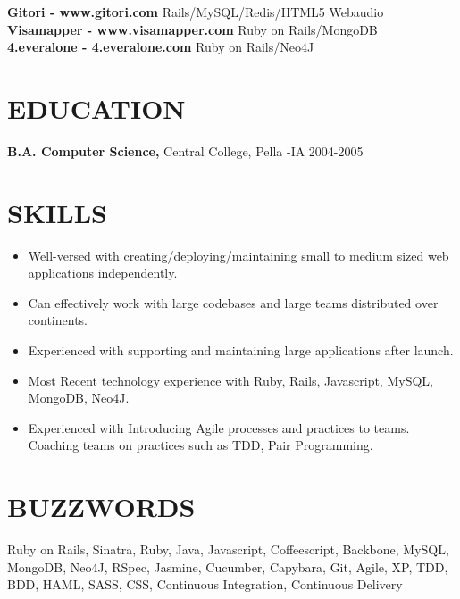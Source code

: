 \documentclass{res}
\begin{document}
\begin{resume}
\begin{tabbing}
    {\bf Gitori - www.gitori.com}   \>Rails/MySQL/Redis/HTML5 Webaudio \\

    {\bf Visamapper - www.visamapper.com  } \>Ruby on Rails/MongoDB \\
 
    {\bf 4.everalone - 4.everalone.com} \>Ruby on Rails/Neo4J \\
\end{tabbing}

\section{EDUCATION}
    {\bf B.A. Computer Science,} Central College, Pella -IA
    2004-2005


\section{SKILLS}          
 \begin{itemize} \itemsep -2pt  %
\item Well-versed with creating/deploying/maintaining small to medium sized web applications independently.
\item Can effectively work with large codebases and large teams distributed over continents.
\item Experienced with supporting and maintaining large applications after launch.
\item Most Recent technology experience with Ruby, Rails, Javascript, MySQL, MongoDB, Neo4J. 
\item Experienced with Introducing Agile processes and practices to teams. Coaching teams on practices such as TDD, Pair Programming.

 \end{itemize}


\section{BUZZWORDS}          
Ruby on Rails, Sinatra, Ruby, Java, Javascript, Coffeescript, Backbone, MySQL, MongoDB, Neo4J, RSpec, Jasmine, Cucumber, Capybara, Git, Agile, XP, TDD, BDD, HAML, SASS, CSS, Continuous Integration, Continuous Delivery 
 
\end{resume}
\end{document}
